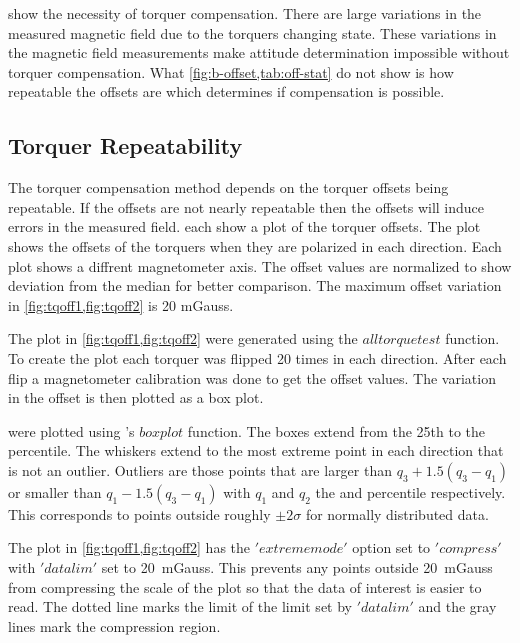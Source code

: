  show the necessity of torquer compensation. There are large variations in the measured magnetic field due to the torquers changing state. These variations in the magnetic field measurements make attitude determination impossible without torquer compensation. What \cref{fig:b-offset,tab:off-stat} do not show is how repeatable the offsets are which determines if compensation is possible. 

\subsection{Torquer Repeatability}


The torquer compensation method depends on the torquer offsets being repeatable. If the offsets are not nearly repeatable then the offsets will induce errors in the measured field.  each show a plot of the torquer offsets. The plot shows the offsets of the torquers when they are polarized in each direction. Each plot shows a diffrent magnetometer axis. The offset values are normalized to show deviation from the median for better comparison. The maximum offset variation in \cref{fig:tqoff1,fig:tqoff2} is 20 mGauss.

The plot in \cref{fig:tqoff1,fig:tqoff2} were generated using the \lstMat$alltorquetest$ function. To create the plot each torquer was flipped 20 times in each direction. After each flip a magnetometer calibration was done to get the offset values. The variation in the offset is then plotted as a box plot.

 were plotted using \matlab's \lstMat$boxplot$ function. The boxes extend from the 25th to the  percentile. The whiskers extend to the most extreme point in each direction that is not an outlier. Outliers are those points that are larger than $q_3 + 1.5 \left( q_3 - q_1 \right)$ or smaller than $q_1 - 1.5 \left( q_3 - q_1 \right)$ with $q_1$ and $q_2$ the  and  percentile respectively. This corresponds to points outside roughly $\pm 2 \sigma$ for normally distributed data. \cite{MatBox}

The plot in \cref{fig:tqoff1,fig:tqoff2} has the \lstMat$'extrememode'$ option set to \lstMat$'compress'$ with \lstMat$'datalim'$ set to \textpm{}20~mGauss. This prevents any points outside \textpm{}20~mGauss from compressing the scale of the plot so that the data of interest is easier to read. The dotted line marks the limit of the limit set by \lstMat$'datalim'$ and the gray lines mark the compression region. \cite{MatBox}

